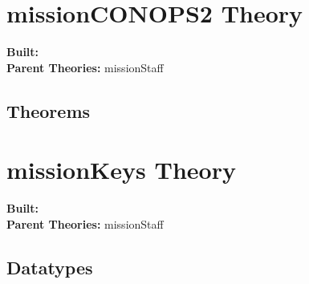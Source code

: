\documentclass[11pt, twoside]{article}
\begin{document}
\HOLmissionStaffTheorems

\section{missionCONOPS2 Theory}
\begin{flushleft}
\textbf{Built:} \HOLmissionCONOPSTwoDate \\[2pt]
\textbf{Parent Theories:} missionStaff
\end{flushleft}



\subsection{Theorems}

\HOLmissionCONOPSTwoTheorems

\section{missionKeys Theory}
\begin{flushleft}
\textbf{Built:} \HOLmissionKeysDate \\[2pt]
\textbf{Parent Theories:} missionStaff
\end{flushleft}

\subsection{Datatypes}

\HOLmissionKeysDatatypes



\HOLindex
\end{document}
